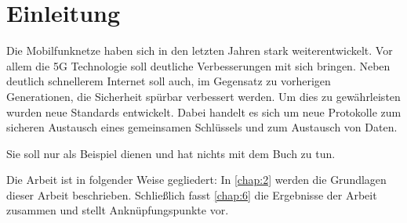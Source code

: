 \chapter{Einleitung}
\label{chap:1}

Die Mobilfunknetze haben sich in den letzten Jahren stark weiterentwickelt. %
Vor allem die 5G Technologie soll deutliche Verbesserungen mit sich bringen. 
Neben deutlich schnellerem Internet soll auch, im Gegensatz zu vorherigen Generationen, die Sicherheit sp\"urbar verbessert werden.
Um dies zu gew\"ahrleisten wurden neue Standards entwickelt. 
Dabei handelt es sich um neue Protokolle zum sicheren Austausch eines gemeinsamen Schl\"ussels und zum Austausch von Daten. 


Sie soll nur als Beispiel dienen und hat nichts mit dem Buch \cite{WSPA} zu tun.


Die Arbeit ist in folgender Weise gegliedert:
In \cref{chap:2} werden die Grundlagen dieser Arbeit beschrieben.
Schließlich fasst \cref{chap:6} die Ergebnisse der Arbeit zusammen und stellt Anknüpfungspunkte vor.
